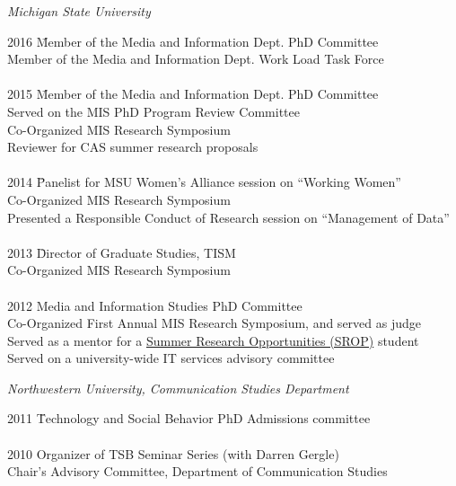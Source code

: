 \documentclass[9pt]{extarticle}
\begin{document}
\emph{Michigan State University} \\
\vspace{1pt}
\begin{tabbing}
2016 \hspace{0.3in}\=  Member of the Media and Information Dept. PhD Committee \\ %
\> Member of the Media and Information Dept. Work Load Task Force \\\\%

2015 \hspace{0.3in}\=  Member of the Media and Information Dept. PhD Committee \\ %
\> Served on the MIS PhD Program Review Committee \\ %
\> Co-Organized MIS Research Symposium \\ %
\> Reviewer for CAS summer research proposals \\\\ %

2014 \hspace{0.3in}\=  Panelist for MSU Women's Alliance session on ``Working Women'' \\ %
\> Co-Organized MIS Research Symposium \\ %
\> Presented a Responsible Conduct of Research session on ``Management of Data'' \\\\ %

2013 \hspace{0.3in}\=  Director of Graduate Studies, TISM \\
\> Co-Organized MIS Research Symposium \\\\ %

2012 \>  Media and Information Studies PhD Committee \\
\> Co-Organized First Annual MIS Research Symposium, and served as judge \\ %
\> Served as a mentor for a \href{https://grad.msu.edu/srop}{Summer Research Opportunities (SROP)} student \\ %
\> Served on a university-wide IT services advisory committee %
\end{tabbing}

\emph{Northwestern University, Communication Studies Department} \\
\vspace{1pt}
\begin{tabbing}
2011 \hspace{0.3in}\=  Technology and Social Behavior PhD Admissions committee \\\\
2010 \> Organizer of TSB Seminar Series (with Darren Gergle) \\
\> Chair's Advisory Committee, Department of Communication Studies
\end{tabbing}
\end{document}
